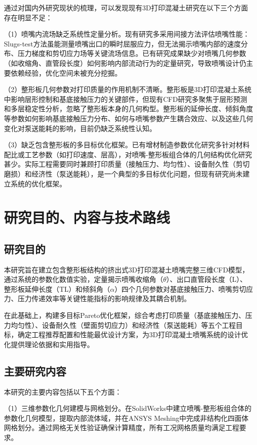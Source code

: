 通过对国内外研究现状的梳理，可以发现现有3D打印混凝土研究在以下三个方面存在明显不足：

（1）喷嘴内流场缺乏系统性定量分析。现有研究多采用间接方法评估喷嘴性能：Slugs-test方法虽能测量喷嘴出口的瞬时屈服应力，但无法揭示喷嘴内部的速度分布、压力梯度和剪切应力场等关键流场信息。已有研究成果缺少对喷嘴几何参数（如收缩角、直管段长度）如何影响内部流动行为的定量研究，导致喷嘴设计仍主要依赖经验，优化空间未被充分挖掘。

（2）整形板几何参数对打印质量的作用机制不清晰。整形板是3D打印混凝土系统中影响层形控制和基底接触压力的关键部件，但现有CFD研究多聚焦于层形预测和多层稳定性分析，忽略了整形板本身的几何构型。整形板的延伸长度、倾斜角度等参数如何影响基底接触压力分布、如何与喷嘴参数产生耦合效应、以及这些几何变化对泵送能耗的影响，目前仍缺乏系统性认知。

（3）缺乏包含整形板的多目标优化框架。已有增材制造参数优化研究多针对材料配比或工艺参数（如打印速度、层高），对喷嘴-整形板组合体的几何结构优化研究甚少。实际工程需要同时兼顾打印质量（接触压力、均匀性）、设备耐久性（剪切磨损）和经济性（泵送能耗），是一个典型的多目标优化问题，但现有研究尚未建立系统的优化框架。

\section{研究目的、内容与技术路线}

\subsection{研究目的}

本研究旨在建立包含整形板结构的挤出式3D打印混凝土喷嘴完整三维CFD模型，通过系统的参数化数值实验，定量揭示喷嘴收缩角（$\theta$）、出口直管段长度（L）、整形板延伸长度（TL）和倾斜角（$\alpha$）四个几何参数对基底接触压力、喷嘴剪切应力、压力传递效率等关键性能指标的影响规律及其耦合机制。

在此基础上，构建多目标Pareto优化框架，综合考虑打印质量（基底接触压力、压力均匀性）、设备耐久性（壁面剪切应力）和经济性（泵送能耗）等五个工程目标，确定工程推荐配置和性能最优设计方案，为3D打印混凝土喷嘴系统的设计优化提供理论依据和实用指导。

\subsection{主要研究内容}

本研究的主要内容包括以下五个方面：

（1）三维参数化几何建模与网格划分。在SolidWorks中建立喷嘴-整形板组合体的参数化几何模型，提取内部流体域，并在ANSYS Meshing中完成非结构化四面体网格划分。通过网格无关性验证确保计算精度，所有工况网格质量均满足工程要求。

